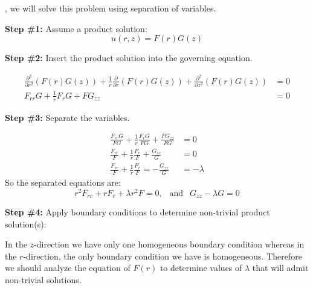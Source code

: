 , we will solve this problem using separation of variables.

\vspace{0.25cm}

\noindent\textbf{Step \#1:} Assume a product solution:
\begin{equation*}
u(r,z) = F(r)G(z)
\end{equation*}

\vspace{5.0cm}

\noindent\textbf{Step \#2:} Insert the product solution into the governing equation.

\begin{align*}
\frac{\partial^2}{\partial r^2}\left(F(r)G(z) \right) + \frac{1}{r}\frac{\partial}{\partial r}\left(F(r) G(z)\right) + \frac{\partial^2}{\partial z^2}\left( F(r)G(z)\right) &= 0 \\
F_{rr}G + \frac{1}{r}F_rG + FG_{zz} &= 0
\end{align*}

\vspace{0.15cm}

\noindent\textbf{Step \#3:} Separate the variables.

\begin{align*}
\frac{F_{rr}G}{FG} + \frac{1}{r}\frac{F_r G}{FG} + \frac{FG_{zz}}{FG} &= 0 \\
\frac{F_{rr}}{F} + \frac{1}{r}\frac{F_r}{F} + \frac{G_{zz}}{G} &= 0 \\
\frac{F_{rr}}{F} + \frac{1}{r}\frac{F_r}{F} = -\frac{G_{zz}}{G} &= -\lambda
\end{align*}
So the separated equations are:
\begin{equation*}
r^2F_{rr} + rF_r + \lambda r^2 F = 0, \ \ \text{ and } \ \ G_{zz} - \lambda G = 0
\end{equation*}

\noindent\textbf{Step \#4:} Apply boundary conditions to determine non-trivial product solution(s):

\vspace{0.05cm}

\noindent In the $z$-direction we have only one homogeneous boundary condition whereas in the $r$-direction, the only boundary condition we have is homogeneous.  Therefore we should analyze the equation of $F(r)$ to determine values of $\lambda$ that will admit non-trivial solutions.

